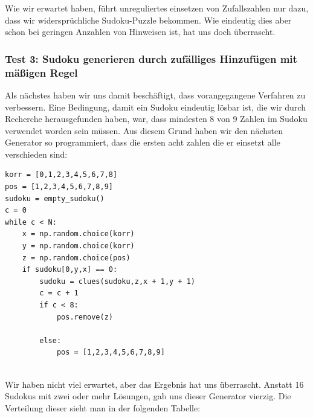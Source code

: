 \documentclass[11pt,a4paper]{article}
\begin{document}
Wie wir erwartet haben, führt unreguliertes einsetzen von Zufallszahlen nur dazu, dass wir widersprüchliche Sudoku-Puzzle bekommen. Wie eindeutig dies aber schon bei geringen Anzahlen von Hinweisen ist, hat uns doch überrascht. 

\subsubsection{Test 3: Sudoku generieren durch zufälliges Hinzufügen mit mäßigen Regel}
Als nächstes haben wir uns damit beschäftigt, dass vorangegangene Verfahren zu verbessern. Eine Bedingung, damit ein Sudoku eindeutig lösbar ist, die wir durch Recherche herausgefunden haben, war, dass mindesten 8 von 9 Zahlen im Sudoku verwendet worden sein müssen. Aus diesem Grund haben wir den nächsten Generator so programmiert, dass die ersten acht zahlen die er einsetzt alle verschieden sind:  
\ \\
\begin{verbatim}                 
korr = [0,1,2,3,4,5,6,7,8]               
pos = [1,2,3,4,5,6,7,8,9]                
sudoku = empty_sudoku()          
c = 0                            
while c < N:                                  
    x = np.random.choice(korr)                
    y = np.random.choice(korr)                
    z = np.random.choice(pos)                 
    if sudoku[0,y,x] == 0:                    
        sudoku = clues(sudoku,z,x + 1,y + 1)  
        c = c + 1                             
        if c < 8:                             
            pos.remove(z)                     
                
        else:                                 
            pos = [1,2,3,4,5,6,7,8,9]                           
\end{verbatim}
\ \\
Wir haben nicht viel erwartet, aber das Ergebnis hat uns überrascht. Anstatt 16 Sudokus mit zwei oder mehr Lösungen, gab uns dieser Generator vierzig. Die Verteilung dieser sieht man in der folgenden Tabelle:
\end{document}
